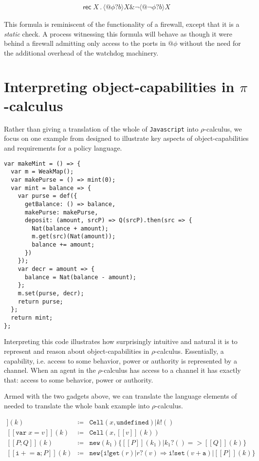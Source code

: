 \documentclass[]{amsart}
\makeatletter
\newcommand{\ldb}{[\![}
\newcommand{\rdb}{]\!]}
\newcommand{\id}[1]{\texttt{#1}}
\newcommand{\juxtap}{\mathbin{\id{|}}}
\newcommand{\binpar}[2]{#1 \juxtap #2}
\newcommand{\quotep}[1]{@#1}
\newcommand{\meaningof}[1]{\ldb #1 \rdb}
\newcommand{\defneqls}{\coloneqq}
\newcommand{\pprefix}[3]{\langle #1 ? #2 \rangle #3}
\newcommand{\pgfp}[2]{\textsf{rec} \; #1 \mathbin{.} #2}
\theoremstyle{definition}
\theoremstyle{remark}
\numberwithin{equation}{subsection}
\newcommand{\pic}{$\pi$-calculus}
\newcommand{\rhoc}{$\rho$-calculus}
\makeatother
\begin{document}
\begin{eqnarray}
  \pgfp{X}{\pprefix{\quotep{\phi}}{b}{X} \& \neg \pprefix{\quotep{\neg \phi}}{b}{X}} \nonumber
\end{eqnarray} 

This formula is reminiscent of the functionality of a firewall, except
that it is a \emph{static} check. A process witnessing this formula
will behave as though it were behind a firewall admitting only access
to the ports in $\quotep{\phi}$ without the need for the additional
overhead of the watchdog machinery.

\section{Interpreting object-capabilities in \pic}

Rather than giving a translation of the whole of \texttt{Javascript}
into \rhoc, we focus on one example from \cite{Drossopoulou} designed
to illustrate key aspects of object-capabilities and requirements for
a policy language.

\begin{lstlisting}
var makeMint = () => {
  var m = WeakMap();
  var makePurse = () => mint(0);
  var mint = balance => {
    var purse = def({
      getBalance: () => balance,
      makePurse: makePurse,
      deposit: (amount, srcP) => Q(srcP).then(src => {
        Nat(balance + amount);
        m.get(src)(Nat(amount));
        balance += amount;
      })
    });
    var decr = amount => {
      balance = Nat(balance - amount);
    };
    m.set(purse, decr);
    return purse;
  };
  return mint;
};
\end{lstlisting}

Interpreting this code illustrates how surprisingly intuitive and
natural it is to represent and reason about object-capabilities in
\rhoc. Essentially, a capability, i.e. access to some behavior, power
or authority is represented by a channel. When an agent in the \rhoc\;
has access to a channel it has exactly that: access to some behavior,
power or authority.


Armed with the two gadgets above, we can translate the language elements of
needed to translate the whole bank example into \rhoc.

\begin{eqnarray*}
 \meaningof{\texttt{var}\; x}( k ) & \defneqls & \binpar{\texttt{Cell}( x, \texttt{undefined} )}{k!()} \\
 \meaningof{\texttt{var}\; x = v}( k ) & \defneqls & \texttt{Cell}( x, \meaningof{ v }( k ) ) \\
 \meaningof{ P ; Q }( k ) & \defneqls & \texttt{new}(k_1)\{ \binpar{\meaningof{ P }( k_1 )}{ k_1?() => \meaningof{ Q }( k )} \} \\
 \meaningof{ \texttt{i} +\!= \texttt{a} ; P }( k ) & \defneqls & \texttt{new} \{ \binpar{\binpar{\texttt{i} ! \texttt{get}( r )}{r?( v ) \Rightarrow \texttt{i}! \texttt{set}( v + \texttt{a} ) }}{\meaningof{P}( k )} \}\\
\end{eqnarray*}
\end{document}
